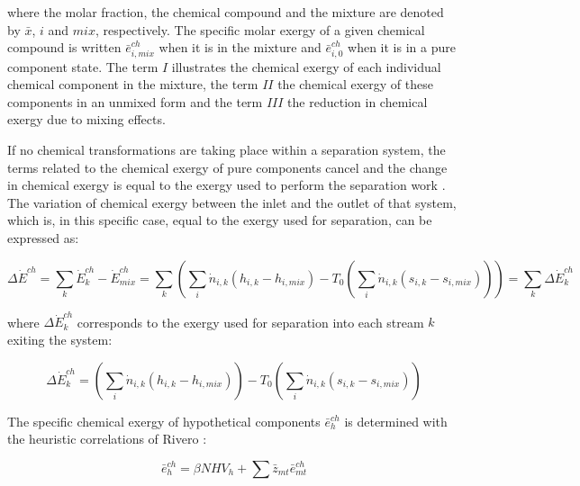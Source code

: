 \documentclass[times,3p]{elsarticle}
\begin{document}
	where the molar fraction, the chemical compound and the mixture are denoted by $\bar{x}$, $i$ and $mix$, respectively. The specific molar exergy of a given chemical compound is written $\bar{e}^{ch}_{i,mix}$ when it is in the mixture and $\bar{e}^{ch}_{i,0}$ when it is in a pure component state. The term $I$ illustrates the chemical exergy of each individual chemical component in the mixture, the term $II$ the chemical exergy of these components in an unmixed form and the term $III$ the reduction in chemical exergy due to mixing effects.  


If no chemical transformations are taking place within a separation system, the terms related to the chemical exergy of pure components cancel and the change in chemical exergy is equal to the exergy used to perform the separation work \cite{Kotas1995}. The variation of chemical exergy between the inlet and the outlet of that system, which is, in this specific case, equal to the exergy used for separation, can be expressed as:

\begin{equation}
\Delta \dot{E}^{ch} = \sum_k \dot{E}^{ch}_k-\dot{E}^{ch}_{mix} = \sum_k \left( \sum_i \dot{n}_{i,k} \left(h_{i,k}-h_{i,mix}\right)-T_0\left(\sum_i \dot{n}_{i,k}\left(s_{i,k}-s_{i,mix}\right)\right)\right) = \sum_k \Delta \dot{E}^{ch}_k
\end{equation}

	where $\Delta \dot{E}^{ch}_k$ corresponds to the exergy used for separation into each stream $k$ exiting the system:

\begin{equation}
\Delta \dot{E}^{ch}_k = \left(\sum_i \dot{n}_{i,k} \left(h_{i,k}-h_{i,mix}\right)\right)-T_0\left(\sum_i \dot{n}_{i,k}\left(s_{i,k}-s_{i,mix}\right)\right)
\end{equation}	

The specific chemical exergy of hypothetical components $\bar{e}^{ch}_h$ is determined with the heuristic correlations of Rivero \cite{Rivero1999}:
	
\begin{equation}
	\bar{e}^{ch}_h=\beta NHV_h+\sum \bar{z}_{mt} \bar{e}^{ch}_{mt}
\end{equation}
	
	
\end{document}
